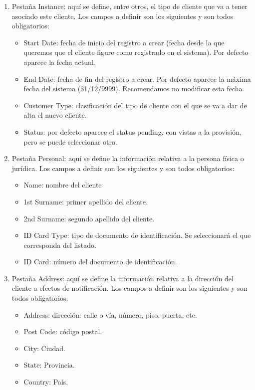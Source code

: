 \begin{enumerate}
\item Pestaña Instance: aquí se define, entre otros, el tipo de cliente que va a tener asociado este cliente. Los campos a definir son los siguientes y son todos obligatorios:
	\begin{itemize}
	\item Start Date: fecha de inicio del registro a crear (fecha desde la que queremos que el cliente figure como registrado en el sistema). Por defecto aparece la fecha actual.
	\item End Date: fecha de fin del registro a crear. Por defecto aparece la máxima fecha del sistema (31/12/9999). Recomendamos no modificar esta fecha.
	\item Customer Type: clasificación del tipo de cliente con el que se va a dar de alta el nuevo cliente.
	\item Status: por defecto aparece el status pending, con vistas a la provisión, pero se puede seleccionar otro.
	\end{itemize}
\item Pestaña Personal: aquí se define la información relativa a la persona física o jurídica. Los campos a definir son los siguientes y son todos obligatorios:
	\begin{itemize}
	\item Name: nombre del cliente
	\item 1st Surname: primer apellido del cliente.
	\item 2nd Surname: segundo apellido del cliente.
	\item ID Card Type: tipo de documento de identificación. Se seleccionará el que corresponda del listado.
	\item ID Card: número del documento de identificación.
	\end{itemize}
\item Pestaña Address: aquí se define la información relativa a la dirección del cliente a efectos de notificación. Los campos a definir son los siguientes y son todos obligatorios:
	\begin{itemize}
	\item Address: dirección: calle o vía, número, piso, puerta, etc.
	\item Post Code: código postal.
	\item City: Ciudad.
	\item State: Provincia.
	\item Country: País.
	\end{itemize}

\end{enumerate}
